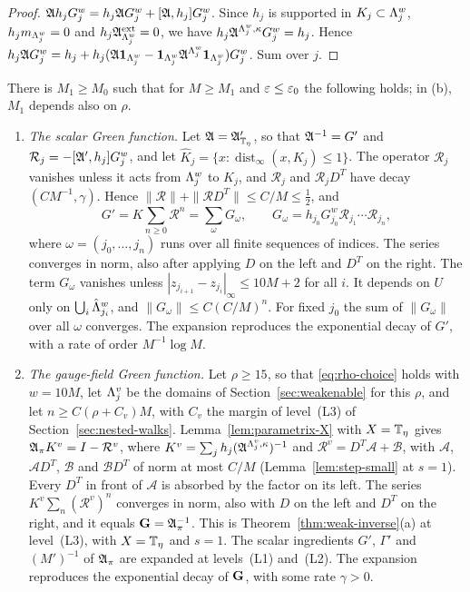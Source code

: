\begin{proof}
$\mathfrak A h_jG^w_j=h_j\mathfrak A G^w_j+[\mathfrak A,h_j]G^w_j$. Since $h_j$ is supported in $K_j\subset\Lambda^w_j$, $h_jm_{\Lambda^w_j}=0$ and $h_j\mathfrak A^{\rm ext}_{\Lambda^w_j}=0$, we have $h_j\mathfrak A^{\Lambda^w_j,\kappa}G^w_j=h_j$. Hence $h_j\mathfrak A G^w_j=h_j+h_j(\mathfrak A\mathbf 1_{\Lambda^w_j}-\mathbf 1_{\Lambda^w_j}\mathfrak A^{\Lambda^w_j}\mathbf 1_{\Lambda^w_j})G^w_j$. Sum over $j$.
\end{proof}

\begin{theorem}\label{thm:random-walk}
There is $M_1\ge M_0$ such that for $M\ge M_1$ and $\varepsilon\le\varepsilon_0$ the following holds; in (b), $M_1$ depends also on $\rho$.
\begin{enumerate}[label=(\alph*)]
\item \emph{The scalar Green function.} Let $\mathfrak A=\mathfrak A'_{\mathbb T_\eta}$, so that $\mathfrak A^{-1}=G'$ and $\mathcal R_j=-[\mathfrak A',h_j]G^w_j$, and let $\hat K_j=\{x:\operatorname{dist}_\infty(x,K_j)\le1\}$. The operator $\mathcal R_j$ vanishes unless it acts from $\Lambda^w_j$ to $\hat K_j$, and $\mathcal R_j$ and $\mathcal R_jD^T$ have decay $(CM^{-1},\gamma)$. Hence $\|\mathcal R\|+\|\mathcal RD^T\|\le C/M\le\frac12$, and
\[
G'=K\sum_{n\ge0}\mathcal R^n=\sum_{\omega}G_\omega,\qquad G_\omega=h_{j_0}G^w_{j_0}\mathcal R_{j_1}\cdots\mathcal R_{j_n},
\]
where $\omega=(j_0,\dots,j_n)$ runs over all finite sequences of indices. The series converges in norm, also after applying $D$ on the left and $D^T$ on the right. The term $G_\omega$ vanishes unless $|z_{j_{i+1}}-z_{j_i}|_\infty\le10M+2$ for all $i$. It depends on $U$ only on $\bigcup_i\hat{\Lambda}^w_{j_i}$, and $\|G_\omega\|\le C(C/M)^n$. For fixed $j_0$ the sum of $\|G_\omega\|$ over all $\omega$ converges. The expansion reproduces the exponential decay of $G'$, with a rate of order $M^{-1}\log M$.
\item \emph{The gauge-field Green function.} Let $\rho\ge15$, so that \eqref{eq:rho-choice} holds with $w=10M$, let $\Lambda^v_j$ be the domains of Section~\ref{sec:weakenable} for this $\rho$, and let $n\ge C(\rho+C_v)M$, with $C_v$ the margin of level~(L3) of Section~\ref{sec:nested-walks}. Lemma~\ref{lem:parametrix-X} with $X=\mathbb T_\eta$ gives $\mathfrak A_\pi K^v=I-\mathcal R^v$, where $K^v=\sum_jh_j(\mathfrak A^{\Lambda^v_j,\kappa})^{-1}$ and $\mathcal R^v=D^T\mathcal A+\mathcal B$, with $\mathcal A$, $\mathcal AD^T$, $\mathcal B$ and $\mathcal BD^T$ of norm at most $C/M$ (Lemma~\ref{lem:step-small} at $s=1$). Every $D^T$ in front of $\mathcal A$ is absorbed by the factor on its left. The series $K^v\sum_n(\mathcal R^v)^n$ converges in norm, also with $D$ on the left and $D^T$ on the right, and it equals $\mathbf G=\mathfrak A_\pi^{-1}$. This is Theorem~\ref{thm:weak-inverse}(a) at level~(L3), with $X=\mathbb T_\eta$ and $s=1$. The scalar ingredients $G'$, $\Gamma'$ and $(M')^{-1}$ of $\mathfrak A_\pi$ are expanded at levels~(L1) and~(L2). The expansion reproduces the exponential decay of $\mathbf G$, with some rate $\gamma>0$.
\end{enumerate}
\end{theorem}

